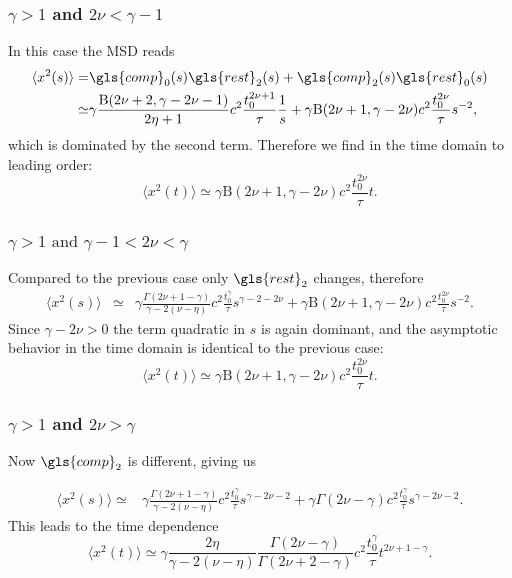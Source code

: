 \subsubsection{$\gamma>1$ and $2\nu < \gamma-1$}
In this case the MSD reads
\begin{align}
\langle x^2(s) \rangle =& \gls{comp}_0(s) \gls{rest}_2(s) + \gls{comp}_2(s)  \gls{rest}_0(s) \nonumber \\
 \simeq & \gamma \frac{\mathrm{B}(2\nu +2, \gamma - 2\nu -1)}{2\eta+1} c^2 \frac{t_0^{2\nu+1}}{\tau}\frac{1} {s}   + \gamma \mathrm{B}(2\nu+1,\gamma-2\nu) c^2 \frac{t_0^{2\nu}}{\tau}  s^{-2} \nonumber ,
\end{align}
which is dominated by the second term. Therefore we find in the time domain to leading order:
\begin{equation}
\langle x^2(t) \rangle \simeq \gamma \mathrm{B}(2\nu+1,\gamma-2\nu) c^2 \frac{ t_0^{2\nu}}{\tau}  t.
\end{equation}

\subsubsection{$\gamma>1 \text{ and }  \gamma-1 <2\nu < \gamma$}
Compared to the previous case only $\gls{rest}_2$ changes, therefore
\begin{align}
\langle x^2(s) \rangle &\simeq & \gamma \frac{\Gamma(2\nu+1-\gamma)}{\gamma - 2(\nu-\eta)} c^2\frac{t_0^{\gamma}}{\tau}  s^{\gamma-2-2\nu}  + \gamma \mathrm{B}(2\nu+1,\gamma-2\nu) c^2\frac{t_0^{2\nu}}{\tau}  s^{-2} .
\end{align}
Since $\gamma-2\nu>0$ the term quadratic in $s$ is again dominant, and the asymptotic behavior in the time domain is identical to the previous case:
\begin{equation}
\langle x^2(t) \rangle \simeq   \gamma \mathrm{B}(2\nu+1,\gamma-2\nu) c^2
\frac{t_0^{2\nu}}{\tau}  t.
\end{equation}

\subsubsection{$\gamma>1$ and $2\nu > \gamma$}
Now $\gls{comp}_2$ is different, giving us 

\begin{align}
\langle x^2(s) \rangle \simeq & \gamma \frac{\Gamma(2\nu+1-\gamma)}{\gamma - 2(\nu-\eta)} c^2 \frac{t_0^{\gamma}}{\tau}  s^{\gamma-2\nu-2} + \gamma \Gamma(2\nu-\gamma) c^2\frac {t_0^{\gamma}}{\tau}  s^{\gamma-2\nu-2}. 
\end{align}
This leads to the time dependence 
\begin{equation}
\langle x^2(t) \rangle \simeq \gamma   \frac{2 \eta }{\gamma - 2(\nu-\eta) } \frac{\Gamma(2\nu-\gamma)}{\Gamma(2\nu + 2-\gamma)} c^2  \frac{t_0^{\gamma}}{\tau } t^{2\nu+1-\gamma}.
\end{equation}

